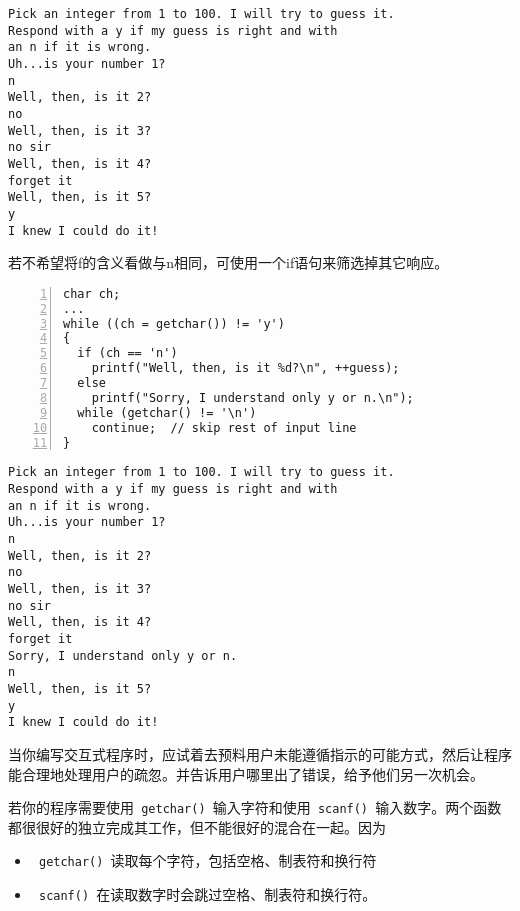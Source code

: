 \begin{frame}[fragile]\ft{\secname}
\begin{lstlisting}
Pick an integer from 1 to 100. I will try to guess it.
Respond with a y if my guess is right and with
an n if it is wrong.
Uh...is your number 1?
n
Well, then, is it 2?
no
Well, then, is it 3?
no sir
Well, then, is it 4?
forget it
Well, then, is it 5?
y
I knew I could do it!
\end{lstlisting}
\end{frame}

\begin{frame}[fragile]\ft{\secname}
若不希望将f的含义看做与n相同，可使用一个if语句来筛选掉其它响应。
\begin{lstlisting}[numbers=left]
char ch;
...
while ((ch = getchar()) != 'y')
{
  if (ch == 'n')
    printf("Well, then, is it %d?\n", ++guess);
  else
    printf("Sorry, I understand only y or n.\n");
  while (getchar() != '\n')
    continue;  // skip rest of input line
}
\end{lstlisting}


\end{frame}

\begin{frame}[fragile]\ft{\secname}
\begin{lstlisting}
Pick an integer from 1 to 100. I will try to guess it.
Respond with a y if my guess is right and with
an n if it is wrong.
Uh...is your number 1?
n
Well, then, is it 2?
no
Well, then, is it 3?
no sir
Well, then, is it 4?
forget it
Sorry, I understand only y or n.
n
Well, then, is it 5?
y
I knew I could do it!
\end{lstlisting}

\end{frame}

\begin{frame}[fragile]\ft{\secname}
当你编写交互式程序时，应试着去预料用户未能遵循指示的可能方式，然后让程序能合理地处理用户的疏忽。并告诉用户哪里出了错误，给予他们另一次机会。
\end{frame}

\begin{frame}[fragile]
若你的程序需要使用\lstinline| getchar() |输入字符和使用\lstinline| scanf() |输入数字。两个函数都很很好的独立完成其工作，但不能很好的混合在一起。因为
\begin{itemize}
\item
\lstinline| getchar() |读取每个字符，包括空格、制表符和换行符
\item
\lstinline| scanf() |在读取数字时会跳过空格、制表符和换行符。
\end{itemize}
\end{frame}

